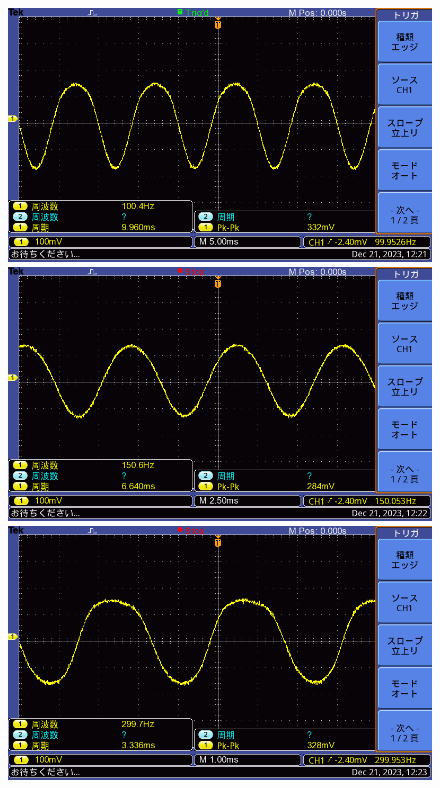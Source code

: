 \documentclass{ltjsarticle}
\begin{document}
			\begin{figure}[H]
			\centering
			\begin{minipage}{0.4\columnwidth}
			\centering
			\includegraphics[width = \columnwidth]{figs/F0016TEK.PNG}
			\end{minipage}
			\hspace{0.04\columnwidth}
			\begin{minipage}{0.4\columnwidth}
			\centering
			\includegraphics[width = \columnwidth]{figs/F0017TEK.PNG}
			\end{minipage}
			\hspace{0.04\columnwidth}
			\begin{minipage}{0.4\columnwidth}
			\centering
			\includegraphics[width = \columnwidth]{figs/F0018TEK.PNG}

\end{minipage}
\end{figure}
\end{document}
